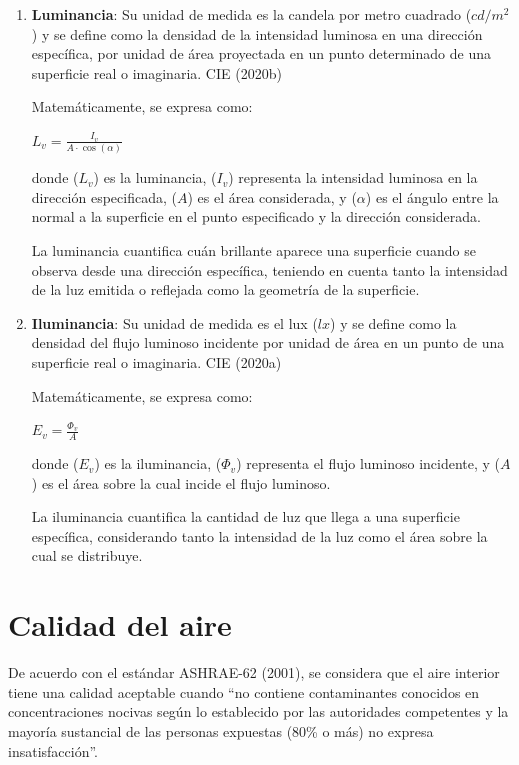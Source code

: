 \documentclass[
  letterpaper,
]{scrbook}
\begin{document}
\begin{enumerate}
\def\labelenumi{\arabic{enumi}.}
\item
  \textbf{Luminancia}: Su unidad de medida es la candela por metro
  cuadrado (\(cd/m^2\)) y se define como la densidad de la intensidad
  luminosa en una dirección específica, por unidad de área proyectada en
  un punto determinado de una superficie real o imaginaria. CIE (2020b)

  Matemáticamente, se expresa como:

  \(L_v = \frac{I_v}{A \cdot \cos(\alpha)}\)

  donde (\(L_v\)) es la luminancia, (\(I_v\)) representa la intensidad
  luminosa en la dirección especificada, (\(A\)) es el área considerada,
  y (\(\alpha\)) es el ángulo entre la normal a la superficie en el
  punto especificado y la dirección considerada.

  La luminancia cuantifica cuán brillante aparece una superficie cuando
  se observa desde una dirección específica, teniendo en cuenta tanto la
  intensidad de la luz emitida o reflejada como la geometría de la
  superficie.
\item
  \textbf{Iluminancia}: Su unidad de medida es el lux (\(lx\)) y se
  define como la densidad del flujo luminoso incidente por unidad de
  área en un punto de una superficie real o imaginaria. CIE (2020a)

  Matemáticamente, se expresa como:

  \(E_v = \frac{\Phi_v}{A}\)

  donde (\(E_v\)) es la iluminancia, (\(\Phi_v\)) representa el flujo
  luminoso incidente, y (\(A\)) es el área sobre la cual incide el flujo
  luminoso.

  La iluminancia cuantifica la cantidad de luz que llega a una
  superficie específica, considerando tanto la intensidad de la luz como
  el área sobre la cual se distribuye.
\end{enumerate}

\section{Calidad del aire}\label{calidad-del-aire}

De acuerdo con el estándar ASHRAE-62 (2001), se considera que el aire
interior tiene una calidad aceptable cuando ``no contiene contaminantes
conocidos en concentraciones nocivas según lo establecido por las
autoridades competentes y la mayoría sustancial de las personas
expuestas (80\% o más) no expresa insatisfacción''.
\end{document}
